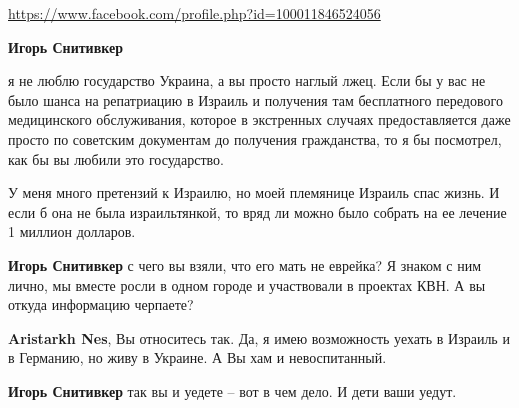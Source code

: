 \begin{itemize}
\begin{itemize}
\url{https://www.facebook.com/profile.php?id=100011846524056}\par
 
\textbf{Игорь Снитивкер} 

я не люблю государство Украина, а вы просто наглый лжец. Если бы у вас не было
шанса на репатриацию в Израиль и получения там бесплатного передового
медицинского обслуживания, которое в экстренных случаях предоставляется даже
просто по советским документам до получения гражданства, то я бы посмотрел, как
бы вы любили это государство.

У меня много претензий к Израилю, но моей племянице Израиль спас жизнь. И если
б она не была израильтянкой, то вряд ли можно было собрать на ее лечение 1
миллион долларов.

 
\textbf{Игорь Снитивкер} с чего вы взяли, что его мать не еврейка? Я знаком с ним лично, мы вместе росли в одном городе и участвовали в проектах КВН. А вы откуда информацию черпаете?

 
\textbf{Aristarkh Nes}, Вы относитесь так. Да, я имею возможность уехать в Израиль и в Германию, но живу в Украине. А Вы хам и невоспитанный.

 
\textbf{Игорь Снитивкер} так вы и уедете – вот в чем дело. И дети ваши уедут.

 

\end{itemize}
\end{itemize}
